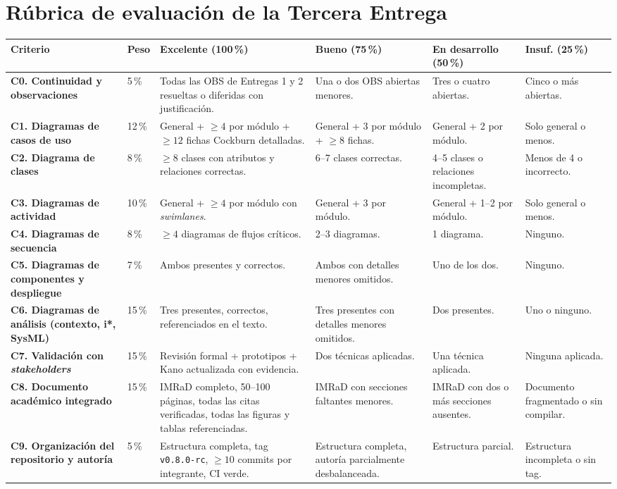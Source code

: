\documentclass[11pt,a4paper]{article}
\begin{document}
\section{R\'ubrica de evaluaci\'on de la Tercera Entrega}

\begin{longtable}{|L{4.2cm}|C{0.9cm}|L{3.3cm}|L{2.4cm}|L{2.4cm}|L{1.6cm}|}
\hline
{}
\textbf{Criterio} & \textbf{Peso} & \textbf{Excelente (100\,\%)} & \textbf{Bueno (75\,\%)} & \textbf{En desarrollo (50\,\%)} & \textbf{Insuf. (25\,\%)}\\ \hline
\endhead

\textbf{C0. Continuidad y observaciones} & 5\,\% & Todas las OBS de Entregas 1 y 2 resueltas o diferidas con justificaci\'on. & Una o dos OBS abiertas menores. & Tres o cuatro abiertas. & Cinco o m\'as abiertas.\\ \hline
{}
\textbf{C1. Diagramas de casos de uso} & 12\,\% & General + $\geq 4$ por m\'odulo + $\geq 12$ fichas Cockburn detalladas. & General + 3 por m\'odulo + $\geq 8$ fichas. & General + 2 por m\'odulo. & Solo general o menos.\\ \hline
\textbf{C2. Diagrama de clases} & 8\,\% & $\geq 8$ clases con atributos y relaciones correctas. & 6--7 clases correctas. & 4--5 clases o relaciones incompletas. & Menos de 4 o incorrecto.\\ \hline
{}
\textbf{C3. Diagramas de actividad} & 10\,\% & General + $\geq 4$ por m\'odulo con \emph{swimlanes}. & General + 3 por m\'odulo. & General + 1--2 por m\'odulo. & Solo general o menos.\\ \hline
\textbf{C4. Diagramas de secuencia} & 8\,\% & $\geq 4$ diagramas de flujos cr\'iticos. & 2--3 diagramas. & 1 diagrama. & Ninguno.\\ \hline
{}
\textbf{C5. Diagramas de componentes y despliegue} & 7\,\% & Ambos presentes y correctos. & Ambos con detalles menores omitidos. & Uno de los dos. & Ninguno.\\ \hline
\textbf{C6. Diagramas de an\'alisis (contexto, i*, SysML)} & 15\,\% & Tres presentes, correctos, referenciados en el texto. & Tres presentes con detalles menores omitidos. & Dos presentes. & Uno o ninguno.\\ \hline
{}
\textbf{C7. Validaci\'on con \emph{stakeholders}} & 15\,\% & Revisi\'on formal + prototipos + Kano actualizada con evidencia. & Dos t\'ecnicas aplicadas. & Una t\'ecnica aplicada. & Ninguna aplicada.\\ \hline
\textbf{C8. Documento acad\'emico integrado} & 15\,\% & IMRaD completo, 50--100 p\'aginas, todas las citas verificadas, todas las figuras y tablas referenciadas. & IMRaD con secciones faltantes menores. & IMRaD con dos o m\'as secciones ausentes. & Documento fragmentado o sin compilar.\\ \hline
{}
\textbf{C9. Organizaci\'on del repositorio y autor\'ia} & 5\,\% & Estructura completa, tag \texttt{v0.8.0-rc}, $\geq 10$ commits por integrante, CI verde. & Estructura completa, autor\'ia parcialmente desbalanceada. & Estructura parcial. & Estructura incompleta o sin tag.\\ \hline
\end{longtable}
\end{document}
